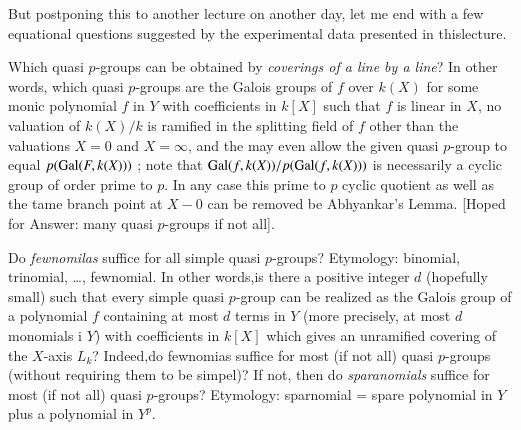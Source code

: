 But postponing this to another lecture on another day, let me end with a few equational questions suggested by the experimental data presented in this\pageoriginale lecture.
\begin{question}\label{chap1-qus9.1}
Which quasi $p$-groups can be obtained by \textit{coverings of a line by a line}? In other words, which quasi $p$-groups are the Galois groups of $f$ over $k(X)$ for some monic polynomial $f$ in $Y$ with coefficients in $k[X]$ such that $f$ is linear in $X$, no valuation of $k(X)/k$ is ramified in the splitting field of $f$ other than the valuations $X=0$ and $X=\infty$, and the may even allow the given quasi $p$-group to equal $p(\operatorname{Gal}(F, k(X)))$ ; note that $\operatorname{Gal}(f, k(X))/p(\operatorname{Gal}(f,k(X)))$ is necessarily a cyclic group of order prime to $p$. In any case this prime to $p$ cyclic quotient as well as the tame branch point at $X-0$ can be removed be Abhyankar's Lemma. [Hoped for Answer: many quasi $p$-groups if not all].
\end{question}

\begin{question}\label{chap1-qus9.2}
Do \textit{fewnomilas} suffice for all simple quasi $p$-groups? Etymology: binomial, trinomial, \ldots, fewnomial. In other words,is there a positive integer $d$ (hopefully small) such that every simple quasi $p$-group can be realized as the Galois group of a polynomial $f$ containing at most $d$ terms in $Y$ (more precisely, at most $d$ monomials i $Y$)
 with coefficients in $k[X]$ which gives an unramified covering of the $X$-axis $L_{k}$? Indeed,do fewnomias suffice for most (if not all) quasi $p$-groups (without requiring them to be simpel)? If not, then do \textit{sparanomials} suffice for most (if not all) quasi $p$-groups? Etymology: sparnomial = spare polynomial in $Y$ plus a polynomial in $Y^{p}$.
\end{question}

